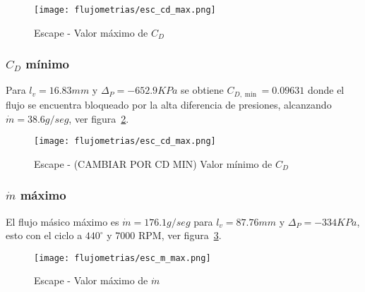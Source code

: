 \begin{figure}[ht]
    \centering
    \texttt{[image: flujometrias/esc\_cd\_max.png]}
    \caption{Escape - Valor máximo de $C_{D}$}\label{fig:esc_cd_max}
\end{figure}

\subsubsection{$C_{D}$ mínimo}
%
Para $l_{v}=16.83 mm$ y $\Delta_{P}=-652.9 KPa$ se obtiene $C_{D, \min}=0.09631$
donde el flujo se encuentra bloqueado por la alta diferencia de presiones,
alcanzando $\dot{m}=38.6 g/seg$, ver figura~\ref{fig:esc_cd_min}.

\begin{figure}[ht]
    \centering
    \texttt{[image: flujometrias/esc\_cd\_max.png]}
    \caption{Escape - (CAMBIAR POR CD MIN) Valor mínimo de $C_{D}$}\label{fig:esc_cd_min}
\end{figure}

\subsubsection{$\dot{m}$ máximo}
%
El flujo másico máximo es $\dot{m}=176.1 g/seg$ para $l_{v}=87.76 mm$ y
$\Delta_{P}=-334 KPa$, esto con el ciclo a $440^{\circ}$ y 7000 RPM,
ver figura~\ref{fig:esc_m_max}.

\begin{figure}[ht]
    \centering
    \texttt{[image: flujometrias/esc\_m\_max.png]}
    \caption{Escape - Valor máximo de $\dot{m}$}\label{fig:esc_m_max}
\end{figure}



%
%

